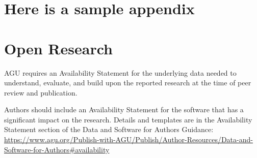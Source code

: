 \documentclass[draft]{agujournal2019}
\begin{document}

%
%
%
%
\appendix
\section{Here is a sample appendix}

%
%

%

%



\section{Open Research}
AGU requires an Availability Statement for the underlying data needed to understand, evaluate, and build upon the reported research at the time of peer review and publication.

Authors should include an Availability Statement for the software that has a significant impact on the research. Details and templates are in the Availability Statement section of the Data and Software for Authors Guidance: \url{https://www.agu.org/Publish-with-AGU/Publish/Author-Resources/Data-and-Software-for-Authors#availability}
\end{document}
